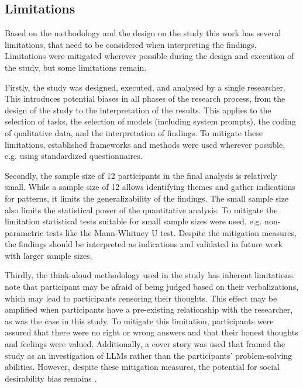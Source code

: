 \subsection{Limitations} \label{ssec:limitations}

Based on the methodology and the design on the study this work has several limitations, that need to be considered when interpreting the findings. Limitations were mitigated wherever possible during the design and execution of the study, but some limitations remain.

Firstly, the study was designed, executed, and analysed by a single researcher. This introduces potential biases in all phases of the research process, from the design of the study to the interpretation of the results. This applies to the selection of tasks, the selection of models (including system prompts), the coding of qualitative data, and the interpretation of findings. To mitigate these limitations, established frameworks and methods were used wherever possible, e.g. using standardized questionnaires.

Secondly, the sample size of 12 participants in the final analysis is relatively small. While a sample size of 12 allows identifying themes and gather indications for patterns, it limits the generalizability of the findings. The small sample size also limits the statistical power of the quantitative analysis. To mitigate the limitation statistical tests suitable for small sample sizes were used, e.g. non-parametric tests like the Mann-Whitney U test. Despite the mitigation measures, the findings should be interpreted as indications and validated in future work with larger sample sizes.

Thirdly, the think-aloud methodology used in the study has inherent limitations. \textcite{VanSomeren1994} note that participant may be afraid of being judged based on their verbalizations, which may lead to participants censoring their thoughts. This effect may be amplified when participants have a pre-existing relationship with the researcher, as was the case in this study. To mitigate this limitation, participants were assured that there were no right or wrong answers and that their honest thoughts and feelings were valued. Additionally, a cover story was used that framed the study as an investigation of \acp{LLM} rather than the participants' problem-solving abilities. However, despite these mitigation measures, the potential for social desirability bias remains \parencite{Krumpal2013}.

